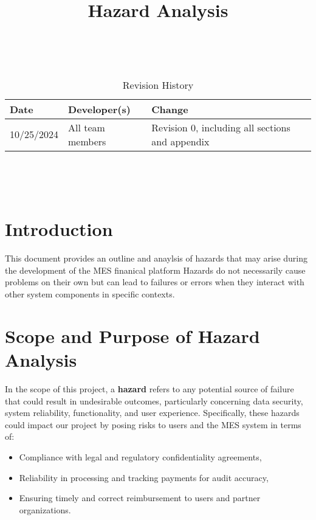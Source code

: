 \documentclass{article}
\title{Hazard Analysis\\\progname}
\author{\authname}
\date{}
\begin{document}
\maketitle
\thispagestyle{empty}

~\newpage


\begin{table}[hp]
\caption{Revision History} \label{TblRevisionHistory}
\begin{tabularx}{\textwidth}{llX}
\toprule
\textbf{Date} & \textbf{Developer(s)} & \textbf{Change}\\
\midrule
10/25/2024 & All team members & Revision 0, including all sections and appendix\\

\bottomrule
\end{tabularx}
\end{table}

~\newpage

\tableofcontents

~\newpage


\section{Introduction}

This document provides an outline and anaylsis of hazards that may arise during the development of the MES finanical platform Hazards do not necessarily cause problems on their own but can lead to failures or errors when they interact with other system components in specific contexts.

\section{Scope and Purpose of Hazard Analysis}

In the scope of this project, a \textbf{hazard} refers to any potential source of failure that could result in undesirable outcomes, particularly concerning data security, system reliability, functionality, and user experience. Specifically, these hazards could impact our project by posing risks to users and the MES system in terms of:

\begin{itemize}
    \item Compliance with legal and regulatory confidentiality agreements,
    \item Reliability in processing and tracking payments for audit accuracy,
    \item Ensuring timely and correct reimbursement to users and partner organizations.
\end{itemize}
\end{document}
